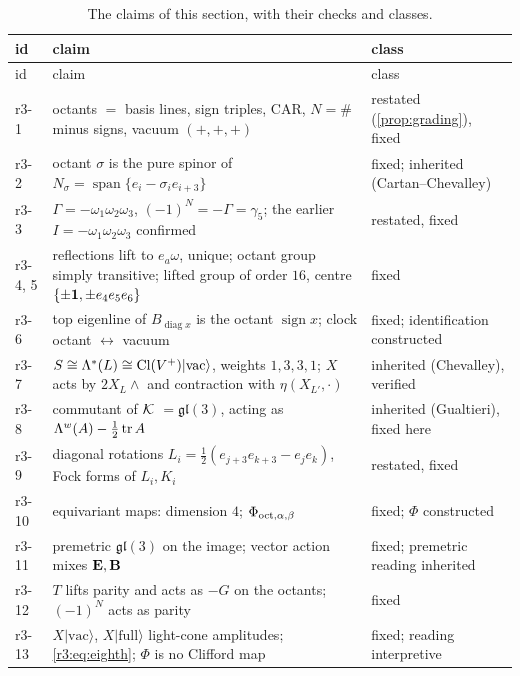 {\small\renewcommand{\arraystretch}{1.12}
\begin{longtable}{@{}>{\raggedright\arraybackslash}p{}>{\raggedright\arraybackslash}p{}>{\raggedright\arraybackslash}p{}@{}}
\caption{The claims of this section, with their checks and classes.}\label{r3:tab:claims}\\
\toprule
id & claim & class\\
\midrule
\endfirsthead
\toprule
id & claim & class\\
\midrule
\endhead
r3-1 & octants $=$ basis lines, sign triples, CAR, $N=\#$ minus signs, vacuum $(+,+,+)$ & restated (\cref{prop:grading}), fixed\\
r3-2 & octant $\sigma$ is the pure spinor of $N_\sigma=\operatorname{span}\{e_i-\sigma_ie_{i+3}\}$ & fixed; inherited (Cartan--Chevalley)\\
r3-3 & $\Gamma=-\omega_1\omega_2\omega_3$, $(-1)^N=-\Gamma=\gamma_5$; the earlier $I=-\omega_1\omega_2\omega_3$ confirmed & restated, fixed\\
r3-4, 5 & reflections lift to $e_a\omega$, unique; octant group simply transitive; lifted group of order $16$, centre $\{\pm\mathbf 1,\pm e_4e_5e_6\}$ & fixed\\
r3-6 & top eigenline of $B_{\operatorname{diag}x}$ is the octant $\operatorname{sign}x$; clock octant $\leftrightarrow$ vacuum & fixed; identification constructed\\
r3-7 & $S\cong\Lambda^*(L)\cong\mathrm{Cl}(V^+)|\mathrm{vac}\rangle$, weights $1,3,3,1$; $X$ acts by $2X_L\wedge$ and contraction with $\eta(X_{L'},\cdot)$ & inherited (Chevalley), verified\\
r3-8 & commutant of $\mathcal K$ $=\mathfrak{gl}(3)$, acting as $\Lambda^w(A)-\tfrac12\operatorname{tr} A$ & inherited (Gualtieri), fixed here\\
r3-9 & diagonal rotations $L_i=\tfrac12(e_{j+3}e_{k+3}-e_je_k)$, Fock forms of $L_i,K_i$ & restated, fixed\\
r3-10 & equivariant maps: dimension $4$; $\Phi_{{\rm oct},\alpha,\beta}$ & fixed; $\Phi$ constructed\\
r3-11 & premetric $\mathfrak{gl}(3)$ on the image; vector action mixes $\mathbf E,\mathbf B$ & fixed; premetric reading inherited\\
r3-12 & $T$ lifts parity and acts as $-G$ on the octants; $(-1)^N$ acts as parity & fixed\\
r3-13 & $X|\mathrm{vac}\rangle$, $X|\mathrm{full}\rangle$ light-cone amplitudes; \cref{r3:eq:eighth}; $\Phi$ is no Clifford map & fixed; reading interpretive\\

\end{longtable}}
